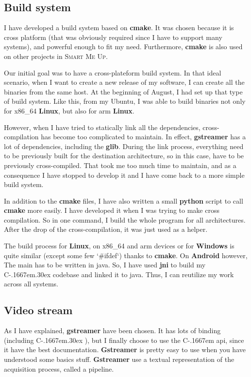 \documentclass[a4paper,11pt]{custom}
\newcommand{\smu}{\textsc{Smart Me Up}\xspace}
\newcommand{\gstreamer}{\textbf{gstreamer}\xspace}
\newcommand{\Gstreamer}{\textbf{Gstreamer}\xspace}
\newcommand{\cmake}{\textbf{cmake}\xspace}
\newcommand{\jni}{\textbf{jni}\xspace}
\newcommand{\python}{\textbf{python}\xspace}
\newcommand{\linux}{\textbf{Linux}\xspace}
\newcommand{\win}{\textbf{Windows}\xspace}
\newcommand{\android}{\textbf{Android}\xspace}
\newcommand{\cpp}{%
  C\kern-.1667em\raise.30ex\hbox{\smaller{++}}%
  \spacefactor1000\xspace%
}
\newcommand{\clang}{%
  C\kern-.1667em%
  \xspace%
}
\begin{document}
\subsection{Build system}

I have developed a build system based on \cmake. It was chosen because it is
cross platform (that was obviously required since I have to support many
systems), and powerful enough to fit my need. Furthermore, \cmake is also used on
other projects in \smu.

Our initial goal was to have a cross-plateform build system. In that ideal
scenario, when I want to create a new release of my software, I can create all
the binaries from the same host. At the beginning of August, I had set up that
type of build system. Like this, from my Ubuntu, I was able to build binaries
not only for x86\_64 \linux, but also for arm \linux.

However, when I have tried to statically link all the dependencies,
cross-compilation has become too complicated to maintain. In effect, \gstreamer
has a lot of dependencies, including the \textbf{glib}. During the link process,
everything need to be previously built for the destination architecture, so in this
case, have to be previously cross-compiled. That took me too much time to
maintain, and as a consequence I have stopped to develop it and I have come
back to a more simple build system.

In addition to the \cmake files, I have also written a small \python script
to call \cmake more easily. I have developed it when I was trying to make
cross compilation. So in one command, I build the whole program for all
architectures. After the drop of the cross-compilation, it was just used as a
helper.

The build process for \linux, on x86\_64 and arm devices or for \win{} is quite
similar (except some few `\#ifdef`) thanks to \cmake. On \android{} however,
The main has to be written in java. So, I have used \jni{} to build my \cpp{}
codebase and linked it to java. Thus, I can reutilize my work across all systems.

\subsection{Video stream}

As I have explained, \gstreamer have been chosen. It has lots of binding
(including \cpp), but I finally choose to use the \clang api, since it have the
best documentation. \Gstreamer is pretty easy to use when you have understood
some basics stuff. \Gstreamer use a textual representation of the acquisition
process, called a pipeline.
\end{document}
